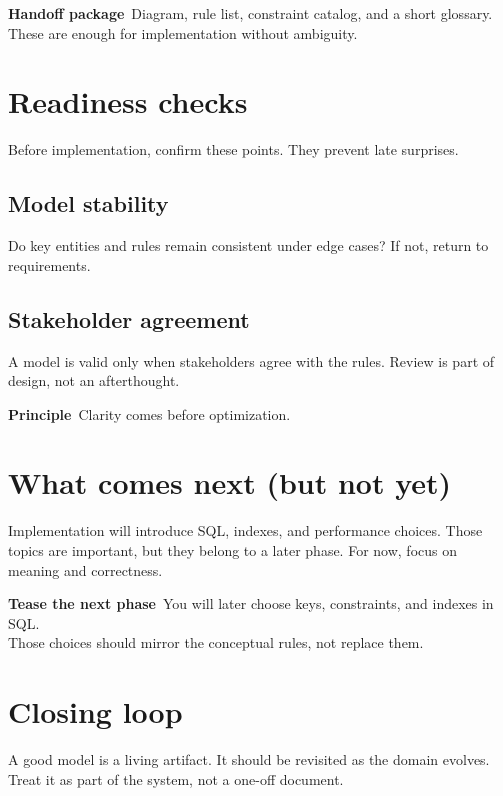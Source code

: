 \begin{examplebox}
\textbf{Handoff package}\
Diagram, rule list, constraint catalog, and a short glossary.\\
These are enough for implementation without ambiguity.
\end{examplebox}

\section{Readiness checks}
Before implementation, confirm these points.
They prevent late surprises.

\subsection{Model stability}
Do key entities and rules remain consistent under edge cases?
If not, return to requirements.

\subsection{Stakeholder agreement}
A model is valid only when stakeholders agree with the rules.
Review is part of design, not an afterthought.

\begin{principlebox}
\textbf{Principle}\
Clarity comes before optimization.
\end{principlebox}

\section{What comes next (but not yet)}
Implementation will introduce SQL, indexes, and performance choices.
Those topics are important, but they belong to a later phase.
For now, focus on meaning and correctness.

\begin{examplebox}
\textbf{Tease the next phase}\
You will later choose keys, constraints, and indexes in SQL.\\
Those choices should mirror the conceptual rules, not replace them.
\end{examplebox}

\section{Closing loop}
A good model is a living artifact.
It should be revisited as the domain evolves.
Treat it as part of the system, not a one-off document.

